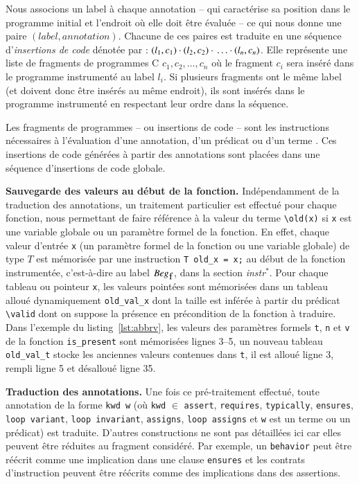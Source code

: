 Nous associons un label à chaque annotation -- qui caractérise sa position dans
le programme initial et l'endroit où elle doit être évaluée -- ce qui nous
donne une paire $(label, annotation)$.
Chacune de ces paires est traduite en une séquence
d'\emph{insertions de code} dénotée par :
$(l_1, c_1) \cdot{} (l_2, c_2) \cdot{} \ldots \cdot{} (l_n, c_n)$.
Elle représente une liste de fragments de programmes C $c_1, c_2, \ldots, c_n$
où le fragment $c_i$ sera inséré dans le programme instrumenté au label $l_i$.
Si plusieurs fragments ont le même label (et doivent donc être insérés au
même endroit), ils sont insérés dans le programme instrumenté en respectant leur
ordre dans la séquence.

Les fragments de programmes -- ou insertions de code -- sont les instructions
nécessaires à l'évaluation d'une annotation, d'un prédicat ou d'un terme
\eacsl.
Ces insertions de code générées à partir des annotations sont placées
dans une séquence d'insertions de code globale.

\textbf{Sauvegarde des valeurs  au début de la fonction.}
Indépendamment de la traduction des annotations, un traitement particulier est
effectué pour chaque fonction, nous permettant de faire référence à la valeur
du terme \lstinline'\old(x)' si \lstinline'x' est une variable globale ou un
paramètre formel de la fonction.
En effet, chaque valeur d'entrée \lstinline'x' (un paramètre formel de la
fonction ou une variable globale) de type $T$ est mémorisée par
une instruction \lstinline'T old_x = x;' au début de la fonction
instrumentée, c'est-à-dire au label $Beg_{\mbox{\lstinline'f'}}$, dans la section
\textit{instr}$^{*}$.
Pour chaque tableau ou pointeur \lstinline'x', les valeurs pointées sont
mémorisées dans un tableau alloué dynamiquement \lstinline'old_val_x' dont la
taille est inférée à partir du prédicat \lstinline'\valid' dont on suppose la
présence en précondition de la fonction à traduire.
Dans l'exemple du listing~\ref{lst:abbrv}, les valeurs des paramètres formels
\lstinline't', \lstinline'n' et \lstinline'v' de la fonction
\lstinline'is_present' sont mémorisées lignes 3--5, un
nouveau tableau \lstinline'old_val_t' stocke les anciennes valeurs contenues
dans \lstinline't', il est alloué ligne 3, rempli ligne 5 et désalloué ligne 35.

\textbf{Traduction des annotations.}
Une fois ce pré-traitement effectué, toute annotation \eacsl de la forme
\lstinline'kwd w' (où \lstinline'kwd' $\in$ \bopen \lstinline'assert',
\lstinline'requires', \lstinline'typically', \lstinline'ensures',
\lstinline'loop variant', \lstinline'loop invariant', \lstinline'assigns',
\lstinline'loop assigns' \bclose et \lstinline'w' est un terme ou un prédicat)
est traduite.
D'autres constructions \eacsl ne sont pas détaillées ici car elles peuvent être
réduites au fragment \eacsl considéré.
Par exemple, un \lstinline'behavior' peut être réécrit comme une implication
dans une clause \lstinline'ensures' et les contrats d'instruction peuvent être
réécrits comme des implications dans des assertions.


